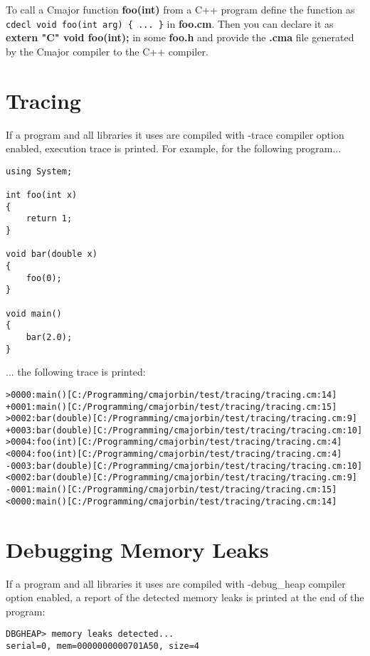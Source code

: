 \documentclass[oneside, a4paper, 11pt]{article}
\begin{document}
To call a Cmajor function \textbf{foo(int)} from a C++ program define the function as\\
\verb|cdecl void foo(int arg) { ... }| in \textbf{foo.cm}. Then you can declare it as
\textbf{extern "C" void foo(int);} in some \textbf{foo.h} and
provide the \textbf{.cma} file generated by the Cmajor compiler to the C++ compiler.

\section{Tracing}

If a program and all libraries it uses are compiled with -trace compiler option enabled,
execution trace is printed. For example, for the following program...

\begin{verbatim}
using System;

int foo(int x)
{
    return 1;
}

void bar(double x)
{
    foo(0);
}

void main()
{
    bar(2.0);
}
\end{verbatim}

... the following trace is printed:

\begin{verbatim}
>0000:main()[C:/Programming/cmajorbin/test/tracing/tracing.cm:14]
+0001:main()[C:/Programming/cmajorbin/test/tracing/tracing.cm:15]
>0002:bar(double)[C:/Programming/cmajorbin/test/tracing/tracing.cm:9]
+0003:bar(double)[C:/Programming/cmajorbin/test/tracing/tracing.cm:10]
>0004:foo(int)[C:/Programming/cmajorbin/test/tracing/tracing.cm:4]
<0004:foo(int)[C:/Programming/cmajorbin/test/tracing/tracing.cm:4]
-0003:bar(double)[C:/Programming/cmajorbin/test/tracing/tracing.cm:10]
<0002:bar(double)[C:/Programming/cmajorbin/test/tracing/tracing.cm:9]
-0001:main()[C:/Programming/cmajorbin/test/tracing/tracing.cm:15]
<0000:main()[C:/Programming/cmajorbin/test/tracing/tracing.cm:14]
\end{verbatim}

\section{Debugging Memory Leaks}

If a program and all libraries it uses are compiled with -debug\_heap compiler option enabled,
a report of the detected memory leaks is printed at the end of the program:

\begin{verbatim}
DBGHEAP> memory leaks detected...
serial=0, mem=0000000000701A50, size=4
\end{verbatim}
\end{document}
